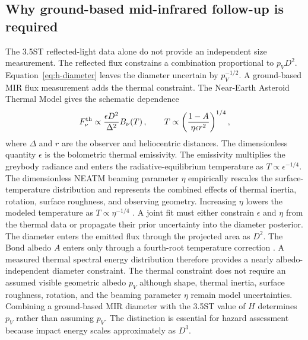 \subsection{Why ground-based mid-infrared follow-up is required}

The 3.5ST reflected-light data alone do not provide an independent size
measurement. The reflected flux constrains a combination proportional to
$p_VD^2$. Equation~\ref{eq:h-diameter} leaves the diameter uncertain by
$p_V^{-1/2}$. A ground-based MIR flux measurement adds the thermal constraint.
The Near-Earth Asteroid Thermal Model gives the schematic dependence
\begin{equation}
 F_{\nu}^{\rm th}
 \mathrel{\propto}
 \frac{\epsilon D^2}{\Delta^2}
 B_\nu\!\left(T\right),
 \qquad
 T\mathrel{\propto}
 \left(\frac{1-A}{\eta\epsilon r^2}\right)^{1/4},
 \label{eq:thermal-diameter}
\end{equation}
where $\Delta$ and $r$ are the observer and heliocentric distances. The
dimensionless quantity $\epsilon$ is the bolometric thermal emissivity. The
emissivity multiplies the greybody radiance and enters the radiative-equilibrium
temperature as $T\propto\epsilon^{-1/4}$. The dimensionless NEATM beaming
parameter $\eta$ empirically rescales the surface-temperature distribution
and represents the combined effects of thermal inertia, rotation, surface
roughness, and observing geometry. Increasing $\eta$ lowers the modeled
temperature as $T\propto\eta^{-1/4}$ \cite{Harris1998}. A joint fit must
either constrain $\epsilon$ and $\eta$ from the thermal data or propagate
their prior uncertainty into the diameter posterior.
The diameter enters the emitted flux through the projected area as $D^2$.
The Bond albedo $A$ enters only through a fourth-root temperature correction
\cite{Harris1998,Mainzer2011}. A measured thermal spectral energy distribution
therefore provides a nearly albedo-independent diameter constraint. The
thermal constraint does not require an assumed visible geometric albedo $p_V$
although shape, thermal inertia, surface roughness, rotation, and the beaming
parameter $\eta$ remain model uncertainties. Combining a ground-based MIR
diameter with the 3.5ST value of $H$ determines $p_V$ rather than assuming
$p_V$. The distinction is essential for hazard assessment because impact
energy scales approximately as $D^3$.

